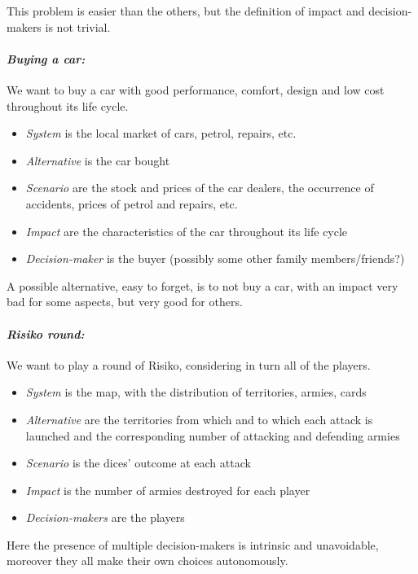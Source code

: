 This problem is easier than the others, but the definition of impact and decision-makers is not trivial.

\paragraph{\textit{Buying a car:}} We want to buy a car with good performance, comfort, design and low cost throughout its life cycle.
\begin{itemize}
	\item \textit{System} is the local market of cars, petrol, repairs, etc.
	
	\item \textit{Alternative} is the car bought 
	
	\item \textit{Scenario} are the stock and prices of the car dealers, the occurrence of accidents, prices of petrol and repairs, etc. 
	
	\item \textit{Impact} are the characteristics of the car throughout its life cycle
	
	\item \textit{Decision-maker} is the buyer (possibly some other family members/friends?)
\end{itemize}

A possible alternative, easy to forget, is to not buy a car, with an impact very bad for some aspects, but very good for others.

\paragraph{\textit{Risiko round:}} We want to play a round of Risiko, considering in turn all of the players.
\begin{itemize}
	\item \textit{System} is the map, with the distribution of territories, armies, cards
	
	\item \textit{Alternative} are the territories from which and to which each attack is launched and the corresponding number of attacking and defending armies
	
	\item \textit{Scenario} is the dices' outcome at each attack
	
	\item \textit{Impact} is the number of armies destroyed for each player
	
	\item \textit{Decision-makers} are the players
\end{itemize}

Here the presence of multiple decision-makers is intrinsic and unavoidable, moreover they all make their own choices autonomously.
